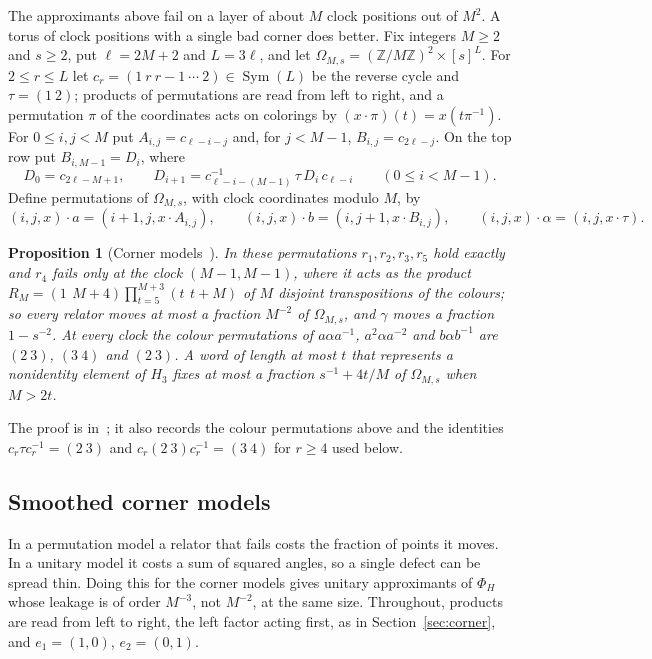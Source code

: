 \documentclass[11pt,a4paper]{article}
\theoremstyle{plain}
\newtheorem{proposition}[theorem]{Proposition}
\theoremstyle{definition}
\theoremstyle{remark}
\DeclareMathOperator{\Sym}{Sym}
\begin{document}
The approximants above fail on a layer of about $M$ clock positions out of $M^2$. A torus of clock positions with a single bad
corner does better. Fix integers $M\ge2$ and $s\ge2$, put $\ell=2M+2$ and $L=3\ell$, and let $\Omega_{M,s}=(\mathbb Z/M\mathbb Z)^2\times[s]^L$.
For $2\le r\le L$ let $c_r=(1\ r\ r{-}1\ \cdots\ 2)\in\Sym(L)$ be the reverse cycle and $\tau=(1\ 2)$; products of permutations are read
from left to right, and a permutation $\pi$ of the coordinates acts on colorings by $(x\cdot\pi)(t)=x(t\pi^{-1})$. For $0\le i,j<M$ put
$A_{i,j}=c_{\ell-i-j}$ and, for $j<M-1$, $B_{i,j}=c_{2\ell-j}$. On the top row put $B_{i,M-1}=D_i$, where
\begin{equation}\label{eq:corner-rec}
D_0=c_{2\ell-M+1},\qquad D_{i+1}=c_{\ell-i-(M-1)}^{-1}\,\tau\,D_i\,c_{\ell-i}\qquad(0\le i<M-1).
\end{equation}
Define permutations of $\Omega_{M,s}$, with clock coordinates modulo $M$, by
\[
(i,j,x)\cdot a=(i+1,j,x\cdot A_{i,j}),\qquad(i,j,x)\cdot b=(i,j+1,x\cdot B_{i,j}),\qquad(i,j,x)\cdot\alpha=(i,j,x\cdot\tau).
\]

\begin{proposition}[Corner models~{\cite[Proposition~6.1]{DouglasMghirbiA}}]\label{prop:corner}
In these permutations $r_1,r_2,r_3,r_5$ hold exactly and $r_4$ fails only at the clock $(M-1,M-1)$, where it acts as the product
$R_M=(1\ \,M{+}4)\prod_{t=5}^{M+3}(t\ \,t{+}M)$ of $M$ disjoint transpositions of the colours; so every relator moves at most
a fraction $M^{-2}$ of $\Omega_{M,s}$, and $\gamma$ moves a fraction $1-s^{-2}$. At every clock the colour permutations of
$a\alpha a^{-1}$, $a^2\alpha a^{-2}$ and $b\alpha b^{-1}$ are $(2\ 3)$, $(3\ 4)$ and $(2\ 3)$. A word of length at most $t$ that represents a nonidentity
element of $H_3$ fixes at most a fraction $s^{-1}+4t/M$ of $\Omega_{M,s}$ when $M>2t$.
\end{proposition}

The proof is in~\cite[Section~6.1]{DouglasMghirbiA}; it also records the colour permutations above and the identities $c_r\tau c_r^{-1}=(2\ 3)$ and $c_r(2\ 3)c_r^{-1}=(3\ 4)$ for $r\ge4$
used below.


\subsection{Smoothed corner models}\label{sec:smoothed}

In a permutation model a relator that fails costs the fraction of points it moves. In a unitary model it costs a sum of squared
angles, so a single defect can be spread thin. Doing this for the corner models gives unitary approximants of $\Phi_H$ whose leakage
is of order $M^{-3}$, not $M^{-2}$, at the same size. Throughout, products are read from left to right, the left factor acting first,
as in Section~\ref{sec:corner}, and $e_1=(1,0)$, $e_2=(0,1)$.
\end{document}
